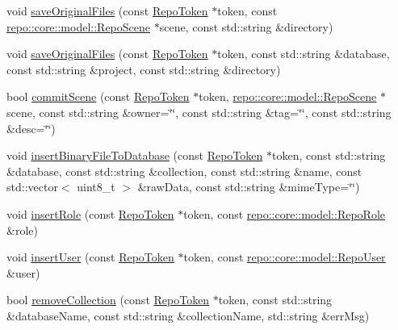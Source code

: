 \begin{DoxyCompactItemize}
\item 
void \hyperlink{class_repo_controller_1_1___repo_controller_impl_a29d7a60011fd77d580a9ae403ad172a3}{save\+Original\+Files} (const \hyperlink{class_repo_controller_1_1_repo_token}{Repo\+Token} $\ast$token, const \hyperlink{classrepo_1_1core_1_1model_1_1_repo_scene}{repo\+::core\+::model\+::\+Repo\+Scene} $\ast$scene, const std\+::string \&directory)
\item 
void \hyperlink{class_repo_controller_1_1___repo_controller_impl_a716d0d63630f5f02897754f788713244}{save\+Original\+Files} (const \hyperlink{class_repo_controller_1_1_repo_token}{Repo\+Token} $\ast$token, const std\+::string \&database, const std\+::string \&project, const std\+::string \&directory)
\item 
bool \hyperlink{class_repo_controller_1_1___repo_controller_impl_aa2d5597cd017075632c1aa2086ca1ae1}{commit\+Scene} (const \hyperlink{class_repo_controller_1_1_repo_token}{Repo\+Token} $\ast$token, \hyperlink{classrepo_1_1core_1_1model_1_1_repo_scene}{repo\+::core\+::model\+::\+Repo\+Scene} $\ast$scene, const std\+::string \&owner=\char`\"{}\char`\"{}, const std\+::string \&tag=\char`\"{}\char`\"{}, const std\+::string \&desc=\char`\"{}\char`\"{})
\item 
void \hyperlink{class_repo_controller_1_1___repo_controller_impl_a44b43dd3976afa7d6cc1bf4a319a3ac2}{insert\+Binary\+File\+To\+Database} (const \hyperlink{class_repo_controller_1_1_repo_token}{Repo\+Token} $\ast$token, const std\+::string \&database, const std\+::string \&collection, const std\+::string \&name, const std\+::vector$<$ uint8\+\_\+t $>$ \&raw\+Data, const std\+::string \&mime\+Type=\char`\"{}\char`\"{})
\item 
void \hyperlink{class_repo_controller_1_1___repo_controller_impl_a4c23846cfb0ba6cd0397b2f76d9fa2b1}{insert\+Role} (const \hyperlink{class_repo_controller_1_1_repo_token}{Repo\+Token} $\ast$token, const \hyperlink{classrepo_1_1core_1_1model_1_1_repo_role}{repo\+::core\+::model\+::\+Repo\+Role} \&role)
\item 
void \hyperlink{class_repo_controller_1_1___repo_controller_impl_ad64a3b64b0568d812c5cbbe8df572463}{insert\+User} (const \hyperlink{class_repo_controller_1_1_repo_token}{Repo\+Token} $\ast$token, const \hyperlink{classrepo_1_1core_1_1model_1_1_repo_user}{repo\+::core\+::model\+::\+Repo\+User} \&user)
\item 
bool \hyperlink{class_repo_controller_1_1___repo_controller_impl_a6832bf065a472552d77f052d91392508}{remove\+Collection} (const \hyperlink{class_repo_controller_1_1_repo_token}{Repo\+Token} $\ast$token, const std\+::string \&database\+Name, const std\+::string \&collection\+Name, std\+::string \&err\+Msg)

\end{DoxyCompactItemize}
